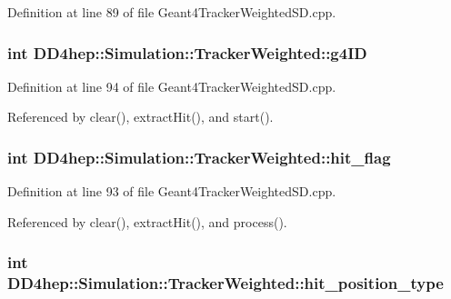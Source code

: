 Definition at line 89 of file Geant4TrackerWeightedSD.cpp.\hypertarget{struct_d_d4hep_1_1_simulation_1_1_tracker_weighted_a1205a645db026a115eb182e439929818}{
\subsubsection[{g4ID}]{\setlength{\rightskip}{0pt plus 5cm}int {\bf DD4hep::Simulation::TrackerWeighted::g4ID}}}
\label{struct_d_d4hep_1_1_simulation_1_1_tracker_weighted_a1205a645db026a115eb182e439929818}


Definition at line 94 of file Geant4TrackerWeightedSD.cpp.

Referenced by clear(), extractHit(), and start().\hypertarget{struct_d_d4hep_1_1_simulation_1_1_tracker_weighted_a9ffa7f998b3a1f16864ecbb894ca2e54}{
\subsubsection[{hit\_\-flag}]{\setlength{\rightskip}{0pt plus 5cm}int {\bf DD4hep::Simulation::TrackerWeighted::hit\_\-flag}}}
\label{struct_d_d4hep_1_1_simulation_1_1_tracker_weighted_a9ffa7f998b3a1f16864ecbb894ca2e54}


Definition at line 93 of file Geant4TrackerWeightedSD.cpp.

Referenced by clear(), extractHit(), and process().\hypertarget{struct_d_d4hep_1_1_simulation_1_1_tracker_weighted_a5120f0b661148efb35b7432c8c58c7ce}{
\subsubsection[{hit\_\-position\_\-type}]{\setlength{\rightskip}{0pt plus 5cm}int {\bf DD4hep::Simulation::TrackerWeighted::hit\_\-position\_\-type}}}
\label{struct_d_d4hep_1_1_simulation_1_1_tracker_weighted_a5120f0b661148efb35b7432c8c58c7ce}



